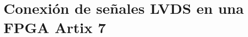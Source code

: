 \documentclass[11pt,letterpaper,oneside]{phstylee}
\begin{document}
\chapter{Conexión de señales LVDS en una FPGA Artix 7}
\label{cap:lvds}






\end{document}
